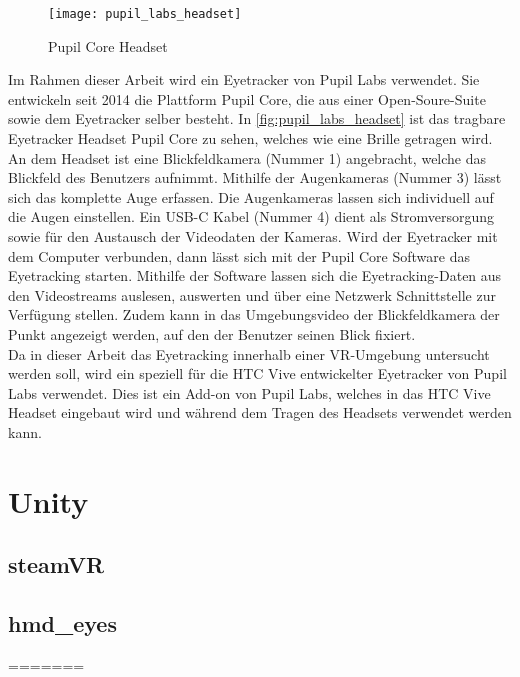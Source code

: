\begin{figure}[!htbp]
	\centering
	\texttt{[image: pupil\_labs\_headset]}
	\caption{Pupil Core Headset}
	\label{fig:pupil_labs_headset}
\end{figure}


Im Rahmen dieser Arbeit wird ein Eyetracker von Pupil Labs verwendet. Sie entwickeln seit 2014 die Plattform Pupil Core, die aus einer Open-Soure-Suite sowie dem Eyetracker selber besteht. In \autoref{fig:pupil_labs_headset} ist das tragbare Eyetracker Headset Pupil Core zu sehen, welches wie eine Brille getragen wird. An dem Headset ist eine Blickfeldkamera (Nummer 1) angebracht, welche das Blickfeld des Benutzers aufnimmt. Mithilfe der Augenkameras (Nummer 3) lässt sich das komplette Auge erfassen. Die Augenkameras lassen sich individuell auf die Augen einstellen. Ein USB-C Kabel (Nummer 4) dient als Stromversorgung sowie für den Austausch der Videodaten der Kameras. Wird der Eyetracker mit dem Computer verbunden, dann lässt sich mit der Pupil Core Software das Eyetracking starten. Mithilfe der Software lassen sich die Eyetracking-Daten aus den Videostreams auslesen, auswerten und über eine Netzwerk Schnittstelle zur Verfügung stellen. Zudem kann in das Umgebungsvideo der Blickfeldkamera der Punkt angezeigt werden, auf den der Benutzer seinen Blick fixiert. \\
Da in dieser Arbeit das Eyetracking innerhalb einer \ac{VR}-Umgebung untersucht werden soll, wird ein speziell für die HTC Vive entwickelter Eyetracker von Pupil Labs verwendet. Dies ist ein Add-on von Pupil Labs, welches in das HTC Vive Headset eingebaut wird und während dem Tragen des Headsets verwendet werden kann.


\cite{PaperPupilLabs}

\section{Unity}

\subsection{steamVR}

\subsection{hmd\_eyes}
=======

